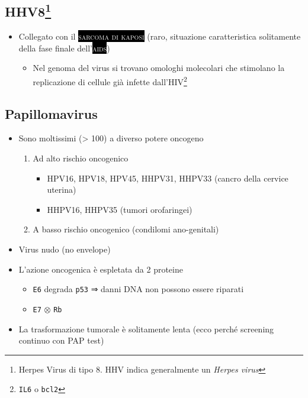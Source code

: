 \documentclass[italian,]{article}
\providecommand{\tightlist}{%
  \setlength{\itemsep}{0pt}\setlength{\parskip}{0pt}}
\newcommand{\pat}[1]{\colorbox{black}{\textcolor{white}{\textsc{#1}}}}
\newcommand{\ini}[0]{ $\otimes$ }                                       %
\begin{document}
\hypertarget{hhv8}{%
\subsection[HHV8]{\texorpdfstring{HHV8\footnote{Herpes Virus di tipo 8.
  HHV indica generalmente un \emph{Herpes virus}}}{HHV8}}\label{hhv8}}

\begin{itemize}
\tightlist
\item
  Collegato con il \pat{sarcoma di kaposi} (raro, situazione
  caratteristica solitamente della fase finale dell'\pat{aids})

  \begin{itemize}
  \tightlist
  \item
    Nel genoma del virus si trovano omologhi molecolari che stimolano la
    replicazione di cellule già infette dall'HIV\footnote{\texttt{IL6} o
      \texttt{bcl2}}
  \end{itemize}
\end{itemize}

\hypertarget{papillomavirus}{%
\subsection{Papillomavirus}\label{papillomavirus}}

\begin{itemize}
\tightlist
\item
  Sono moltissimi (\textgreater{} 100) a diverso potere oncogeno

  \begin{enumerate}
  \def\labelenumi{\arabic{enumi}.}
  \tightlist
  \item
    Ad alto rischio oncogenico

    \begin{itemize}
    \tightlist
    \item
      HPV16, HPV18, HPV45, HHPV31, HHPV33 (cancro della cervice uterina)
    \item
      HHPV16, HHPV35 (tumori orofaringei)
    \end{itemize}
  \item
    A basso rischio oncogenico (condilomi ano-genitali)
  \end{enumerate}
\item
  Virus nudo (no envelope)
\item
  L'azione oncogenica è espletata da 2 proteine

  \begin{itemize}
  \tightlist
  \item
    \texttt{E6} degrada \texttt{p53} ⇒ danni DNA non possono essere
    riparati
  \item
    \texttt{E7} \ini \texttt{Rb}
  \end{itemize}
\item
  La trasformazione tumorale è solitamente lenta (ecco perché screening
  continuo con PAP test)
\end{itemize}
\end{document}

